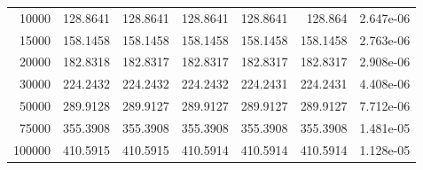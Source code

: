 \begin{longtable}{@{}rrrrrrr@{}}
10000 & 128.8641 & 128.8641 & 128.8641 & 128.8641 & 128.864 & 2.647e-06\\
15000 & 158.1458 & 158.1458 & 158.1458 & 158.1458 & 158.1458 & 2.763e-06\\
20000 & 182.8318 & 182.8317 & 182.8317 & 182.8317 & 182.8317 & 2.908e-06\\
30000 & 224.2432 & 224.2432 & 224.2432 & 224.2431 & 224.2431 & 4.408e-06\\
50000 & 289.9128 & 289.9127 & 289.9127 & 289.9127 & 289.9127 & 7.712e-06\\
75000 & 355.3908 & 355.3908 & 355.3908 & 355.3908 & 355.3908 & 1.481e-05\\
100000 & 410.5915 & 410.5915 & 410.5914 & 410.5914 & 410.5914 & 1.128e-05\\
\bottomrule
\end{longtable}
\endgroup
